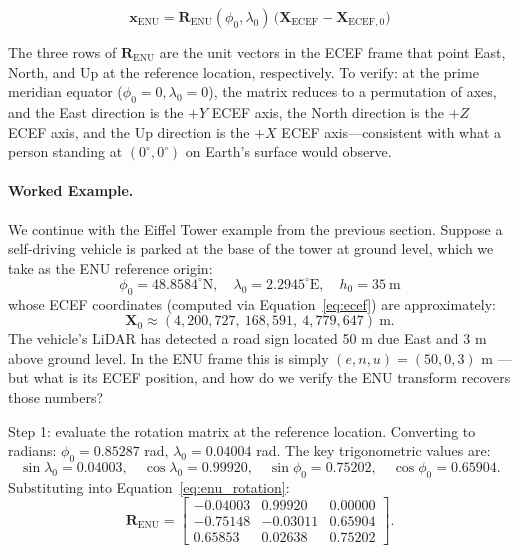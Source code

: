 \documentclass{book}
\begin{document}
\begin{equation}
  \mathbf{x}_{\text{ENU}} = \mathbf{R}_{\text{ENU}}(\phi_0,\lambda_0)
    \,\bigl(\mathbf{X}_{\text{ECEF}} - \mathbf{X}_{\text{ECEF},0}\bigr)
  \label{eq:enu_transform}
\end{equation}

The three rows of $\mathbf{R}_{\text{ENU}}$ are the unit vectors in
the ECEF frame that point East, North, and Up at the reference
location, respectively.  To verify: at the prime meridian equator
($\phi_0 = 0, \lambda_0 = 0$), the matrix reduces to a permutation
of axes, and the East direction is the $+Y$ ECEF axis, the North
direction is the $+Z$ ECEF axis, and the Up direction is the $+X$
ECEF axis---consistent with what a person standing at
$(0^\circ, 0^\circ)$ on Earth's surface would observe.

\paragraph{Worked Example.}

We continue with the Eiffel Tower example from the previous section.
Suppose a self-driving vehicle is parked at the base of the tower
at ground level, which we take as the ENU reference origin:
\[
  \phi_0 = 48.8584^\circ\text{N},\quad
  \lambda_0 = 2.2945^\circ\text{E},\quad
  h_0 = 35\ \text{m}
\]
whose ECEF coordinates (computed via Equation~\ref{eq:ecef}) are
approximately:
\[
  \mathbf{X}_0 \approx
  (4{,}200{,}727,\ 168{,}591,\ 4{,}779{,}647)\ \text{m}.
\]
The vehicle's LiDAR has detected a road sign located 50 m due East
and 3 m above ground level.  In the ENU frame this is simply
$(e, n, u) = (50, 0, 3)$ m --- but what is its ECEF position, and
how do we verify the ENU transform recovers those numbers?

Step 1: evaluate the rotation matrix at the reference location.
Converting to radians: $\phi_0 = 0.85287$ rad,
$\lambda_0 = 0.04004$ rad.  The key trigonometric values are:
\[
  \sin\lambda_0 = 0.04003,\quad \cos\lambda_0 = 0.99920,\quad
  \sin\phi_0    = 0.75202,\quad \cos\phi_0    = 0.65904.
\]
Substituting into Equation~\eqref{eq:enu_rotation}:
\[
  \mathbf{R}_{\text{ENU}} =
  \begin{bmatrix}
    -0.04003 &  0.99920 &  0.00000 \\
    -0.75148 & -0.03011 &  0.65904 \\
     0.65853 &  0.02638 &  0.75202
  \end{bmatrix}.
\]
\end{document}
